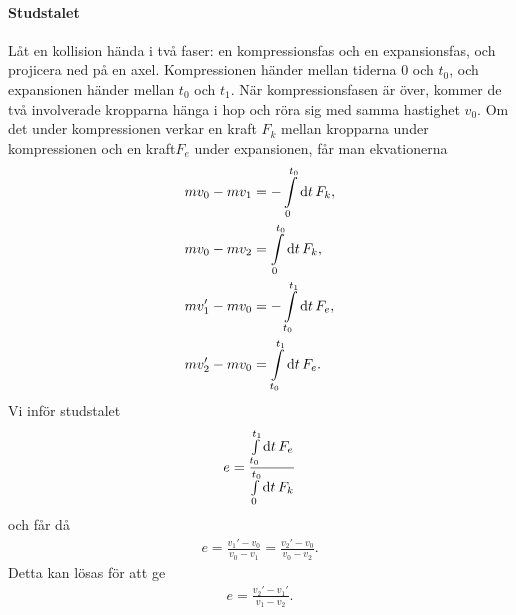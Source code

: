 \paragraph{Studstalet}
Låt en kollision hända i två faser: en kompressionsfas och en expansionsfas, och projicera ned på en axel. Kompressionen händer mellan tiderna $0$ och $t_0$, och expansionen händer mellan $t_0$ och $t_1$. När kompressionsfasen är över, kommer de två involverade kropparna hänga i hop och röra sig med samma hastighet $v_0$. Om det under kompressionen verkar en kraft $F_{k}$ mellan kropparna under kompressionen och en kraft$F_{e}$ under expansionen, får man ekvationerna
\begin{align*}
	mv_0 - mv_1  &= -\int\limits_{0}^{t_0}\dd{t}F_{k}, \\
	mv_0 - mv_2  &= \int\limits_{0}^{t_0}\dd{t}F_{k}, \\
	mv_1' - mv_0 &= -\int\limits_{t_0}^{t_1}\dd{t}F_{e}, \\
	mv_2' - mv_0 &= \int\limits_{t_0}^{t_1}\dd{t}F_{e}.
\end{align*}
Vi inför studstalet
\begin{align*}
	e = \frac{\int\limits_{t_0}^{t_1}\dd{t}F_{e}}{\int\limits_{0}^{t_0}\dd{t}F_{k}}
\end{align*}
och får då
\begin{align*}
	e = \frac{v_1' - v_0}{v_0 - v_1} = \frac{v_2' - v_0}{v_0 - v_2}.
\end{align*}
Detta kan lösas för att ge
\begin{align*}
	e = \frac{v_2' - v_1'}{v_1 - v_2}.
\end{align*}